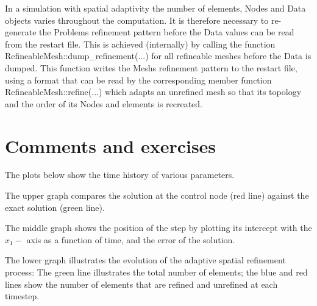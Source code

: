 In a simulation with spatial adaptivity the number of elements, {\ttfamily Nodes} and {\ttfamily Data} objects varies throughout the computation. It is therefore necessary to re-\/generate the {\ttfamily Problem\textquotesingle{}s} refinement pattern before the {\ttfamily Data} values can be read from the restart file. This is achieved (internally) by calling the function {\ttfamily Refineable\+Mesh\+::dump\+\_\+refinement}(...) for all refineable meshes before the {\ttfamily Data} is dumped. This function writes the {\ttfamily Mesh\textquotesingle{}s} refinement pattern to the restart file, using a format that can be read by the corresponding member function {\ttfamily Refineable\+Mesh\+::refine}(...) which adapts an unrefined mesh so that its topology and the order of its {\ttfamily Nodes} and elements is recreated.



 

\hypertarget{index_comments}{}\section{Comments and exercises}\label{index_comments}
The plots below show the time history of various parameters.
\begin{DoxyItemize}
\item The upper graph compares the solution at the control node (red line) against the exact solution (green line).
\item The middle graph shows the position of the step by plotting its intercept with the $ x_1- $ axis as a function of time, and the error of the solution.
\item The lower graph illustrates the evolution of the adaptive spatial refinement process\+: The green line illustrates the total number of elements; the blue and red lines show the number of elements that are refined and unrefined at each timestep.
\end{DoxyItemize}

